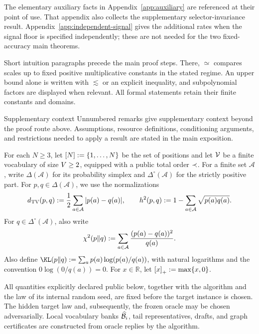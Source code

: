 The elementary auxiliary facts in Appendix~\ref{app:auxiliary} are
referenced at their point of use.  That appendix also collects the
supplementary selector-invariance result.
\ifincludeexponents
Appendix~\ref{app:independent-signal} gives the additional rates when
the signal floor is specified independently; these are not needed for
the two fixed-accuracy main theorems.
\fi

Short intuition paragraphs precede the main proof steps.
There, $\simeq$ compares scales up to fixed positive multiplicative
constants in the stated regime.  An upper bound alone is written with
$\lesssim$ or an explicit inequality, and subpolynomial factors are
displayed when relevant.  All formal statements retain their finite
constants and domains.

\begin{proposalcontext}{Supplementary context}
Unnumbered remarks give supplementary context beyond the proof route above.
Assumptions, resource definitions, conditioning arguments, and restrictions
needed to apply a result are stated in the main exposition.
\end{proposalcontext}

For each $N\ge 3$, let $[N]:=\{1,\ldots,N\}$ be the set of positions and
let $\mathcal V$ be a finite vocabulary of size $V\ge 2$, equipped with
a public total order $\prec$.  For a finite set $\mathcal A$, write
$\Delta(\mathcal A)$ for its probability simplex and
$\Delta^\circ(\mathcal A)$ for the strictly positive part.  For
\(p,q\in\Delta(\mathcal A)\), we use the normalizations
\begin{equation}
 d_{\mathrm{TV}}(p,q)
 :=\frac12\sum_{a\in\mathcal A}|p(a)-q(a)|,
 \qquad
 h^2(p,q)
 :=1-\sum_{a\in\mathcal A}\sqrt{p(a)q(a)}.
 \label{app:eq:distances}
\end{equation}
For \(q\in\Delta^\circ(\mathcal A)\), also write
\begin{equation}
 \chi^2\!\left(p\middle\Vert q\right)
 :=\sum_{a\in\mathcal A}\frac{(p(a)-q(a))^2}{q(a)}.
 \label{app:eq:chi-square-divergence}
\end{equation}
Also define $\KLDivergence{p}{q}:=\sum_a p(a)\log(p(a)/q(a))$, with
natural logarithms and the convention $0\log(0/q(a))=0$.
For \(x\in\mathbb R\), let \(\left[x\right]_+:=\max\{x,0\}\).

All quantities explicitly declared public below, together with the algorithm
and the law of its internal random seed, are fixed before the target instance
is chosen.  The hidden target law and, subsequently, the frozen oracle may be
chosen adversarially.  Local vocabulary banks $\widehat{\mathcal B}_{i}$, tail
representatives, drafts, and graph certificates are constructed from oracle
replies by the algorithm.

